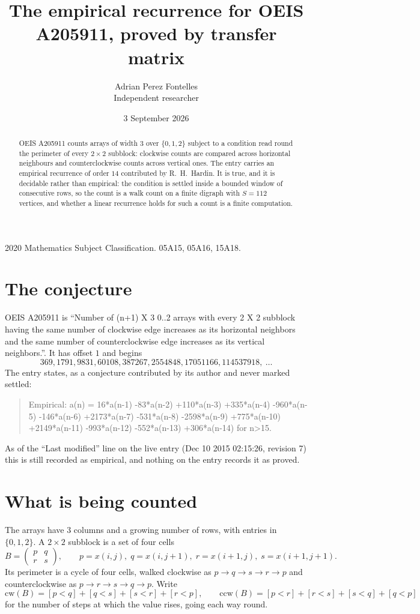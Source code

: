 \documentclass[11pt,a4paper]{article}
\title{The empirical recurrence for OEIS A205911, proved by transfer matrix}
\author{Adrian Perez Fontelles\\ \small Independent researcher}
\date{3 September 2026}
\theoremstyle{plain}
\theoremstyle{definition}
\begin{document}
\maketitle

\begin{abstract}
OEIS A205911 counts arrays of width $3$ over $\{0,1,2\}$ subject to a condition read round the
perimeter of every $2\times2$ subblock: clockwise counts are compared across horizontal neighbours and counterclockwise counts across vertical ones. The entry carries an empirical recurrence of
order $14$ contributed by R.~H.~Hardin. It is true, and it is decidable rather than
empirical: the condition is settled inside a bounded window of consecutive rows, so the
count is a walk count on a finite digraph with $S=112$ vertices, and whether a linear
recurrence holds for such a count is a finite computation.
\end{abstract}

\noindent\small 2020 Mathematics Subject Classification. 05A15, 05A16, 15A18.\normalsize

\section{The conjecture}

OEIS A205911 is ``Number of (n+1) X 3 0..2 arrays with every 2 X 2 subblock having the same number of clockwise edge increases as its horizontal neighbors and the same number of counterclockwise edge increases as its vertical neighbors.''. It has offset $1$ and begins
\[
369, 1791, 9831, 60108, 387267, 2554848, 17051166, 114537918,\ \dots
\]
The entry states, as a conjecture contributed by its author and never marked settled:
\begin{quote}
Empirical: a(n) = 16*a(n-1) -83*a(n-2) +110*a(n-3) +335*a(n-4) -960*a(n-5) -146*a(n-6) +2173*a(n-7) -531*a(n-8) -2598*a(n-9) +775*a(n-10) +2149*a(n-11) -993*a(n-12) -552*a(n-13) +306*a(n-14) for n>15.
\end{quote}
As of the ``Last modified'' line on the live entry (Dec 10 2015 02:15:26, revision 7) this is still
recorded as empirical, and nothing on the entry records it as proved.

\section{What is being counted}

The arrays have $3$ columns and a growing number of rows, with entries in $\{0,1,2\}$. A
$2\times2$ subblock is a set of four cells
\[
B=\begin{pmatrix} p & q \\ r & s \end{pmatrix},
\qquad p=x(i,j),\; q=x(i,j+1),\; r=x(i+1,j),\; s=x(i+1,j+1).
\]
Its perimeter is a cycle of four cells, walked clockwise as $p\to q\to s\to r\to p$ and
counterclockwise as $p\to r\to s\to q\to p$. Write
\[
\mathrm{cw}(B)=[p<q]+[q<s]+[s<r]+[r<p],\qquad
\mathrm{ccw}(B)=[p<r]+[r<s]+[s<q]+[q<p]
\]
for the number of steps at which the value rises, going each way round.
\end{document}
